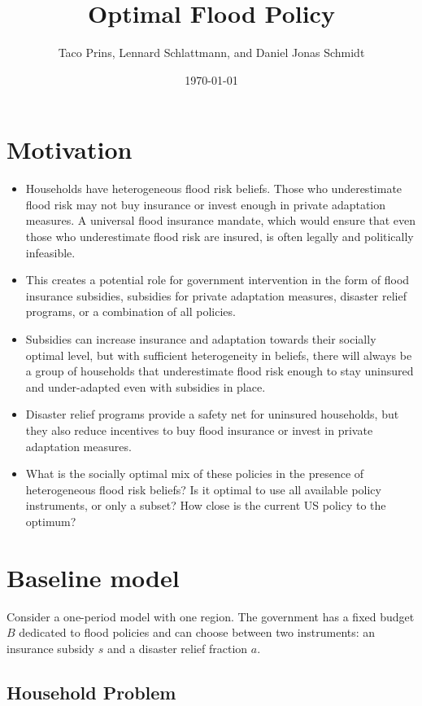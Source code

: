 \documentclass[12pt]{article}
\title{Optimal Flood Policy}
\author{Taco Prins, Lennard Schlattmann, and Daniel Jonas Schmidt}
\date{\today}
\begin{document}
\maketitle

\section{Motivation}
\begin{itemize}
    \item Households have heterogeneous flood risk beliefs. Those who underestimate flood risk may not buy insurance or invest enough in private adaptation measures. A universal flood insurance mandate, which would ensure that even those who underestimate flood risk are insured, is often legally and politically infeasible.
    \item This creates a potential role for government intervention in the form of flood insurance subsidies, subsidies for private adaptation measures, disaster relief programs, or a combination of all policies.
    \item Subsidies can increase insurance and adaptation towards their socially optimal level, but with sufficient heterogeneity in beliefs, there will always be a group of households that underestimate flood risk enough to stay uninsured and under-adapted even with subsidies in place. 
    \item Disaster relief programs provide a safety net for uninsured households, but they also reduce incentives to buy flood insurance or invest in private adaptation measures. 
    \item What is the socially optimal mix of these policies in the presence of heterogeneous flood risk beliefs? Is it optimal to use all available policy instruments, or only a subset? How close is the current US policy to the optimum?
\end{itemize}

\section{Baseline model}

Consider a one-period model with one region. The government has a fixed budget $B$ dedicated to flood policies and can choose between two instruments: an insurance subsidy $s$ and a disaster relief fraction $a$.

\subsection{Household Problem}
\end{document}
